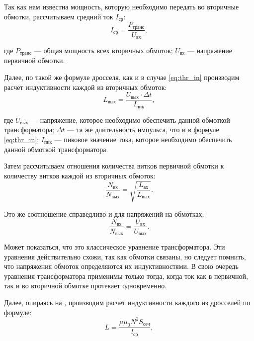 \documentclass[utf8x, 14pt, oneside, a4paper]{article}
\begin{document}
		Так как нам известна мощность, которую необходимо передать во вторичные обмотки, рассчитываем средний ток $I_{\text{ср}}$:
		\begin{equation}
			I_{\text{ср}} = \frac{P_{\text{транс}}}{U_{\text{вх}}},
			\label{eq:I_in}
		\end{equation}
	
		\noindent где $P_{\text{транс}}$ --- общая мощность всех вторичных обмоток; $U_{\text{вх}}$ --- напряжение первичной обмотки.
		
		Далее, по такой же формуле дросселя, как и в случае \ref{eq:thr_in} производим расчет индуктивности каждой из вторичных обмоток:
		\begin{equation}
			L_{\text{вых}} = \frac{U_{\text{вых}} \cdot {\Delta}t}{I_{\text{пик}}},
			\label{eq:thr_out}
		\end{equation}
	
		\noindent где $U_{\text{вых}}$ --- напряжение, которое необходимо обеспечить данной обмоткой трансформатора; ${\Delta}t$ --- та же длительность импульса, что и в формуле \ref{eq:thr_in}; $I_{\text{пик}}$ --- пиковое значение тока, которое необходимо обеспечить данной обмоткой трансформатора.
			
		Затем рассчитываем отношения количества витков первичной обмотки к количеству витков каждой из вторичных обмоток:
		\begin{equation}
			\frac{N_{\text{вх}}}{N_{\text{вых}}} = \sqrt{\frac{L_{\text{вх}}}{L_{\text{вых}}}}.
			\label{eq:N_N_tr}
		\end{equation}
	
		Это же соотношение справедливо и для напряжений на обмотках:
		\begin{equation}
		\frac{N_{\text{вх}}}{N_{\text{вых}}} = \frac{U_{\text{вх}}}{U_{\text{вых}}}.
		\label{eq:U_U_tr}
		\end{equation}
	
		Может показаться, что это классическое уравнение трансформатора. Эти уравнения действительно схожи, так как обмотки связаны, но следует помнить, что напряжения обмоток определяются их индуктивностями. В свою очередь уравнения трансформатора применимы только тогда, когда ток как в первичной, так и во вторичной обмотке протекает одновременно.
		
		Далее, опираясь на \cite{bib:maleshin}, производим расчет индуктивности каждого из дросселей по формуле:
		\begin{equation}
			L = \frac{\mu \mu_{\text{0}} N^2 S_{\text{сеч}}}{l_{\text{ср}}},
			\label{eq:L_meleshin}
		\end{equation}
	
\end{document}
